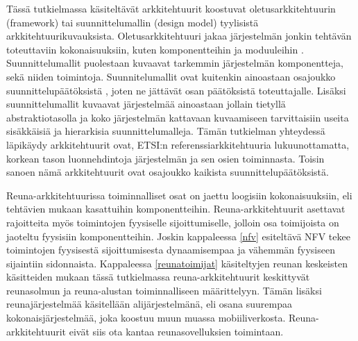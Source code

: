 Tässä tutkielmassa käsiteltävät arkkitehtuurit koostuvat oletusarkkitehtuurin (framework) tai suunnittelumallin (design model) tyylisistä arkkitehtuurikuvauksista. 
Oletusarkkitehtuuri jakaa järjestelmän jonkin tehtävän toteuttaviin kokonaisuuksiin, kuten komponentteihin ja moduuleihin \cite{ohark}. 
Suunnittelumallit puolestaan kuvaavat tarkemmin järjestelmän komponentteja, sekä niiden toimintoja. Suunnitelumallit ovat kuitenkin ainoastaan osajoukko suunnittelupäätöksistä \cite{ohark2}, joten ne jättävät osan päätöksistä toteuttajalle. Lisäksi suunnittelumallit kuvaavat järjestelmää ainoastaan jollain tietyllä abstraktiotasolla ja koko järjestelmän kattavaan kuvaamiseen tarvittaisiin useita sisäkkäisiä ja hierarkisia suunnittelumalleja. Tämän tutkielman yhteydessä läpikäydy arkkitehtuurit ovat, ETSI:n referenssiarkkitehtuuria \cite{etsirefarch} lukuunottamatta, korkean tason luonnehdintoja järjestelmän ja sen osien toiminnasta. Toisin sanoen nämä arkkitehtuurit ovat osajoukko kaikista suunnittelupäätöksistä.
 
Reuna-arkkitehtuurissa toiminnalliset osat on jaettu loogisiin kokonaisuuksiin, eli tehtävien mukaan kasattuihin komponentteihin. Reuna-arkkitehtuurit asettavat rajoitteita myös toimintojen fyysiselle sijoittumiselle, jolloin osa toimijoista on jaoteltu fyysisiin komponentteihin. Joskin kappaleessa \ref{nfv} esiteltävä NFV tekee toimintojen fyysisestä sijoittumisesta dynaamisempaa ja vähemmän fyysiseen sijaintiin sidonnaista. 
Kappaleessa \ref{reunatoimijat} käsiteltyjen reunan keskeisten käsitteiden mukaan tässä tutkielmassa reuna-arkkitehtuurit keskittyvät reunasolmun ja reuna-alustan toiminnalliseen määrittelyyn. 
Tämän lisäksi reunajärjestelmää käsitellään alijärjestelmänä, eli osana suurempaa kokonaisjärjestelmää, joka koostuu muun muassa mobiiliverkosta.
Reuna-arkkitehtuurit eivät siis ota kantaa reunasovelluksien toimintaan.



